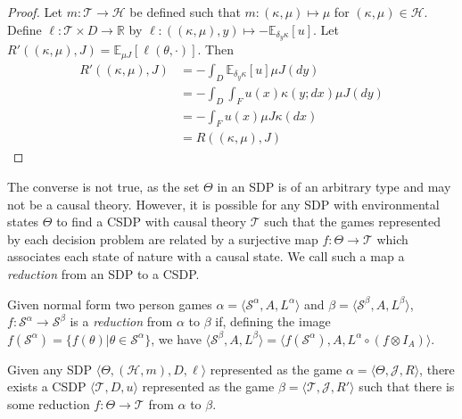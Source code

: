 \begin{proof}
Let $m:\mathscr{T}\to \mathscr{H}$ be defined such that $m:(\kappa,\mu)\mapsto \mu$ for $(\kappa,\mu)\in \mathscr{H}$. Define $\ell:\mathscr{T}\times D\to \mathbb{R}$ by $\ell:((\kappa,\mu),y)\mapsto -\mathbb{E}_{\delta_y \kappa}[u]$. Let $R'((\kappa,\mu),J) = \mathbb{E}_{\mu J}[\ell(\theta,\cdot)]$. Then
\begin{align}
    R'((\kappa,\mu),J) &= -\int_D \mathbb{E}_{\delta_y \kappa}[u] \mu J(dy)\\ 
                       &= -\int_D \int_F u(x) \kappa(y;dx) \mu J(dy)\\
                       &= -\int_F u(x) \mu J \kappa(dx)\\
                       &= R((\kappa,\mu),J)
\end{align}
\end{proof}

The converse is not true, as the set $\Theta$ in an SDP is of an arbitrary type and may not be a causal theory. However, it is possible for any SDP with environmental states $\Theta$ to find a CSDP with causal theory $\mathscr{T}$ such that the games represented by each decision problem are related by a surjective map $f:\Theta\to \mathscr{T}$ which associates each state of nature with a causal state. We call such a map a \emph{reduction} from an SDP to a CSDP.

\begin{definition}[Reduction]\label{def:red_sdp_CSDP}
Given normal form two person games $\alpha = \langle \mathscr{S}^\alpha, A, L^\alpha\rangle$ and $\beta = \langle \mathscr{S}^\beta, A, L^\beta \rangle$, $f:\mathscr{S}^\alpha\to \mathscr{S}^\beta$ is a \emph{reduction} from $\alpha$ to $\beta$ if, defining the image $f(\mathscr{S}^\alpha)=\{f(\theta)|\theta\in \mathscr{S}^\alpha\}$, we have $\langle \mathscr{S}^\beta, A, L^\beta \rangle = \langle f(\mathscr{S}^\alpha), A, L^\alpha\circ(f\otimes I_A)\rangle$.
\end{definition}

\begin{theorem}\label{th:csdps_represent_sdps}
Given any SDP $\langle \Theta, (\mathscr{H},m), D, \ell\rangle$ represented as the game $\alpha = \langle \Theta, \mathscr{J},R\rangle$, there exists a CSDP $\langle \mathscr{T},D,u\rangle$ represented as the game $\beta=\langle\mathscr{T},\mathscr{J},R' \rangle$ such that there is some reduction $f:\Theta\to \mathscr{T}$ from $\alpha$ to $\beta$.
\end{theorem} 

